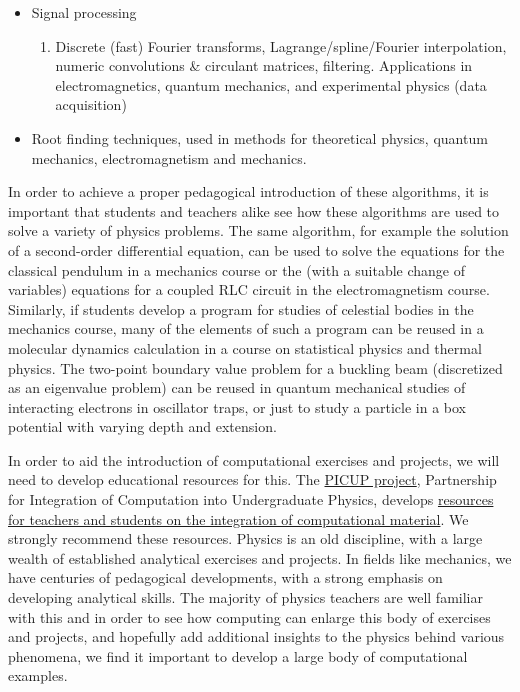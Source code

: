 \documentclass[%
oneside,                 %
final,                   %
10pt]{article}
\begin{document}
\begin{itemize}
\begin{enumerate}
\end{enumerate}

\noindent
 \item Signal processing
\begin{enumerate}

  \item Discrete (fast) Fourier transforms, Lagrange/spline/Fourier interpolation, numeric convolutions {\&} circulant matrices, filtering. Applications in electromagnetics, quantum mechanics, and experimental physics (data acquisition)

\end{enumerate}

\noindent
 \item Root finding techniques, used in methods for theoretical physics, quantum mechanics, electromagnetism and mechanics.
\end{itemize}

\noindent
In order to achieve a proper pedagogical introduction of these algorithms, it is important that students and teachers alike see how these algorithms are used to solve a variety of physics problems. The same algorithm, for example the solution of a second-order differential equation, can be used to solve the equations for the classical pendulum in a mechanics course or the (with a suitable change of variables) equations for a coupled RLC circuit in the electromagnetism course. Similarly, if students develop a program for studies of celestial bodies in the mechanics course, many of the elements of such a program can be reused in a molecular dynamics calculation in a course on statistical physics and thermal physics. The two-point boundary value problem for a buckling beam
(discretized as an eigenvalue problem) can be reused in quantum mechanical studies of interacting electrons in oscillator traps, or just to study a particle in a box potential with varying depth and extension.

In order to aid the introduction of computational exercises and projects, we will need to develop educational resources for this. The \href{{http://www.compadre.org/picup/}}{PICUP project},  Partnership for Integration of Computation into Undergraduate Physics, develops \href{{http://www.compadre.org/PICUP/resources/}}{resources for teachers and students on the integration of computational  material}.   We strongly recommend these resources.  Physics is an old discipline, with a large wealth of established analytical exercises and projects. In fields like mechanics, we have centuries of pedagogical developments, with a strong emphasis on developing analytical skills. The majority of physics teachers are well familiar with this and in order to see how computing can enlarge this body of exercises and projects, and hopefully add additional insights to the physics behind various phenomena, we find it important to develop a large body of computational examples.
\end{document}
